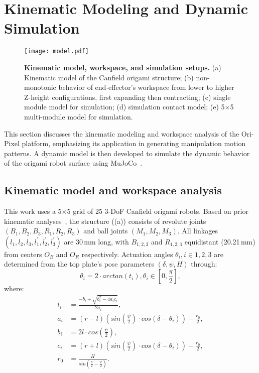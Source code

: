 \section{Kinematic Modeling and Dynamic Simulation}
\label{sec:modeling}
\begin{figure}[t]
    \centering
    \texttt{[image: model.pdf]}
    \caption{\textbf{Kinematic model, workspace, and simulation setups. }(a) Kinematic model of the Canfield origami structure; (b) non-monotonic behavior of end-effector's workspace from lower to higher Z-height configurations, first expanding then contracting; (c) single module model for simulation; (d) simulation contact model; (e) 5$\times$5 multi-module model for simulation.
    }
    \label{fig:modeling}
\end{figure}

This section discusses the kinematic modeling and workspace analysis of the Ori-Pixel platform, emphasizing its application in generating manipulation motion patterns. A dynamic model is then developed to simulate the dynamic behavior of the origami robot surface using MuJoCo~\cite{todorov2012mujoco}.

\subsection{Kinematic model and workspace analysis}
\label{sec:kinematic}
This work uses a 5$\times$5 grid of 25 3-DoF Canfield origami robots. Based on prior kinematic analyses~\cite{Canfield1998, 10122040}, the structure ((a)) consists of revolute joints $(B_1, B_2, B_3, R_1, R_2, R_3)$ and ball joints $(M_1, M_2, M_3)$. All linkages $(l_1, l_2, l_3, l_1^{'}, l_2^{'}, l_3^{'})$ are 30\,mm long, with $B_{1,2,3}$ and $R_{1,2,3}$ equidistant (20.21\,mm) from centers $O_B$ and $O_R$ respectively. Actuation angles ${\theta_i}, i\in{1,2,3}$ are determined from the top plate's pose parameters $(\delta, \psi, H)$ through:
\begin{equation}
\label{eq:kinematic}
    \theta_i=2\cdot arctan(t_i),  \theta_i \in[0, \frac{\pi}{2}],
\end{equation}
where:
\begin{equation}
    \begin{split}
        t_i &=\frac{-b_i\pm \sqrt{b_i^2-4a_ic_i}}{2a_i},\\
        a_i &=(r-l)(sin(\frac{\psi}{2})\cdot cos(\delta-\theta_i))-\frac{r_0}{2},\\
        b_i &=2l\cdot cos(\frac{\psi}{2}),\\
        c_i &=(r+l)(sin(\frac{\psi}{2})\cdot cos(\delta-\theta_i))-\frac{r_0}{2},\\
        r_0 &=\frac{H}{sin(\frac{\pi}{2}-\frac{\psi}{2})}.
 \end{split}
\end{equation}

